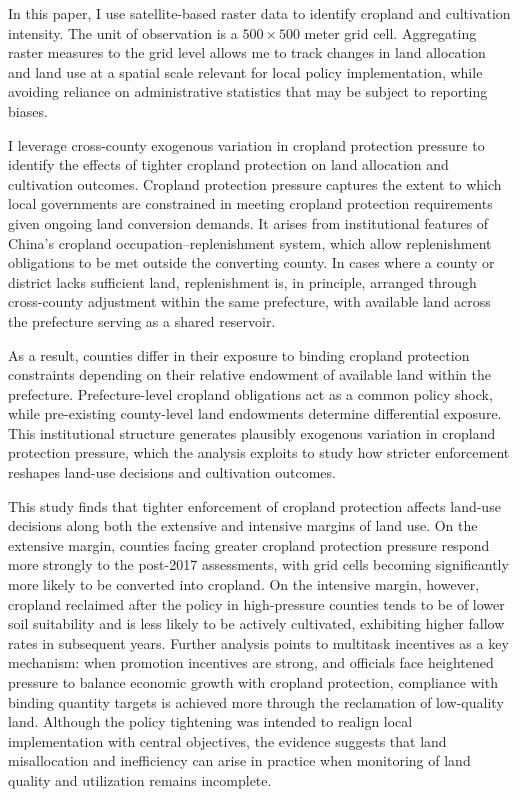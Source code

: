 In this paper, I use satellite-based raster data to identify cropland and cultivation intensity. The unit of observation is a $500 \times 500$ meter grid cell. Aggregating raster measures to the grid level allows me to track changes in land allocation and land use at a spatial scale relevant for local policy implementation, while avoiding reliance on administrative statistics that may be subject to reporting biases.

I leverage cross-county exogenous variation in cropland protection pressure to identify the effects of tighter cropland protection on land allocation and cultivation outcomes. Cropland protection pressure captures the extent to which local governments are constrained in meeting cropland protection requirements given ongoing land conversion demands. It arises from institutional features of China’s cropland occupation--replenishment system, which allow replenishment obligations to be met outside the converting county. In cases where a county or district lacks sufficient land, replenishment is, in principle, arranged through cross-county adjustment within the same prefecture, with available land across the prefecture serving as a shared reservoir.

As a result, counties differ in their exposure to binding cropland protection constraints depending on their relative endowment of available land within the prefecture. Prefecture-level cropland obligations act as a common policy shock, while pre-existing county-level land endowments determine differential exposure. This institutional structure generates plausibly exogenous variation in cropland protection pressure, which the analysis exploits to study how stricter enforcement reshapes land-use decisions and cultivation outcomes.

This study finds that tighter enforcement of cropland protection affects land-use decisions along both the extensive and intensive margins of land use. On the extensive margin, counties facing greater cropland protection pressure respond more strongly to the post-2017 assessments, with grid cells becoming significantly more likely to be converted into cropland. On the intensive margin, however, cropland reclaimed after the policy in high-pressure counties tends to be of lower soil suitability and is less likely to be actively cultivated, exhibiting higher fallow rates in subsequent years. Further analysis points to multitask incentives as a key mechanism: when promotion incentives are strong, and officials face heightened pressure to balance economic growth with cropland protection, compliance with binding quantity targets is achieved more through the reclamation of low-quality land. Although the policy tightening was intended to realign local implementation with central objectives, the evidence suggests that land misallocation and inefficiency can arise in practice when monitoring of land quality and utilization remains incomplete.

